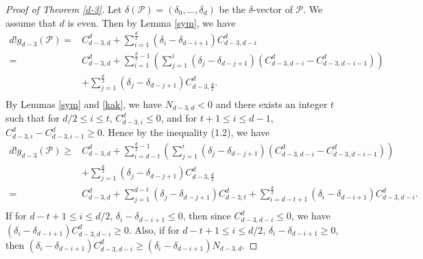 \documentclass[12pt]{amsart}
\theoremstyle{definition}
\theoremstyle{remark}
\numberwithin{equation}{section}
\def\Pc{{\mathcal P}}
\begin{document}
\begin{proof}[Proof of Theorem \ref{d-3}]
	Let $\delta(\Pc)=(\delta_0,\ldots,\delta_d)$ be the $\delta$-vector of $\Pc$.
	We assume that $d$ is even.
	Then by Lemma \ref{sym}, we have
\begin{displaymath}
\begin{aligned}
d!g_{d-3}(\Pc) %
					  =&C_{d-3,d}^d+\sum\limits_{i=1}^{\frac{d}{2}}(\delta_i-\delta_{d-i+1})C_{d-3,d-i}^d\\
					  =&C_{d-3,d}^d+\sum\limits_{i=1}^{\frac{d}{2}-1}\left(\sum\limits_{j=1}^{i}(\delta_j-\delta_{d-j+1})(C_{d-3,d-i}^d-C_{d-3,d-i-1}^d)\right)\\
					  &+\sum\limits_{j=1}^{\frac{d}{2}}(\delta_j-\delta_{d-j+1})C_{d-3,\frac{d}{2}}^d.\\
\end{aligned} 
\end{displaymath}
By Lemmas \ref{sym} and \ref{kak}, we have $N_{d-3,d}<0$ and there exists an integer $t$ such that for $d/2 \leq i \leq t$, $C_{d-3,i}^d \leq 0$, and for $t+1 \leq i \leq d-1$, $C_{d-3,i}^d-C_{d-3,i-1}^d \geq 0$.
Hence by the inequality (1.2), we have
\begin{displaymath}
\begin{aligned}
d!g_{d-3}(\Pc)
\geq& C_{d-3,d}^d+\sum\limits_{i=d-t}^{\frac{d}{2}-1}\left(\sum\limits_{j=1}^{i}(\delta_j-\delta_{d-j+1})(C_{d-3,d-i}^d-C_{d-3,d-i-1}^d)\right)\\
&+\sum\limits_{j=1}^{\frac{d}{2}}(\delta_j-\delta_{d-j+1})C_{d-3,\frac{d}{2}}^d\\
=&C_{d-3,d}^d+\sum\limits_{j=1}^{d-t}(\delta_j-\delta_{d-j+1})C_{d-3,t}^d+\sum\limits_{i=d-t+1}^{\frac{d}{2}}(\delta_i-\delta_{d-i+1})C_{d-3,d-i}^d.\\
\end{aligned} 
\end{displaymath}
If for $d-t+1 \leq i \leq d/2$, $\delta_i-\delta_{d-i+1} \leq 0$, then since $C_{d-3,d-i}^d \leq 0$, we have $(\delta_i-\delta_{d-i+1})C_{d-3,d-i}^d \geq 0$.
Also, if for $d-t+1 \leq i \leq d/2$, $\delta_i-\delta_{d-i+1} \geq 0$, then $(\delta_i-\delta_{d-i+1})C_{d-3,d-i}^d \geq (\delta_i-\delta_{d-i+1})N_{d-3,d}$.

\end{proof}
\end{document}
